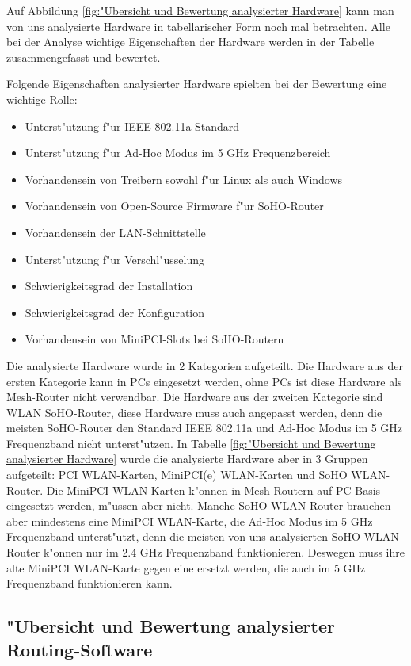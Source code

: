 Auf Abbildung \ref{fig:"Ubersicht und Bewertung analysierter Hardware}
kann man von uns analysierte Hardware in tabellarischer Form noch mal
betrachten. Alle bei der Analyse wichtige Eigenschaften der Hardware
werden in der Tabelle zusammengefasst und bewertet.

Folgende Eigenschaften analysierter Hardware spielten bei der Bewertung
eine wichtige Rolle:

\begin{itemize}
\item Unterst"utzung f"ur IEEE 802.11a Standard
\item Unterst"utzung f"ur Ad-Hoc Modus im 5 GHz Frequenzbereich
\item Vorhandensein von Treibern sowohl f"ur Linux als auch Windows
\item Vorhandensein von Open-Source Firmware f"ur SoHO-Router
\item Vorhandensein der LAN-Schnittstelle
\item Unterst"utzung f"ur Verschl"usselung
\item Schwierigkeitsgrad der Installation
\item Schwierigkeitsgrad der Konfiguration
\item Vorhandensein von MiniPCI-Slots bei SoHO-Routern
\end{itemize}

Die analysierte Hardware wurde in 2 Kategorien aufgeteilt. Die Hardware
aus der ersten Kategorie kann in PCs eingesetzt werden, ohne PCs ist diese
Hardware als Mesh-Router nicht verwendbar. Die Hardware aus der zweiten
Kategorie sind WLAN SoHO-Router, diese Hardware muss auch angepasst werden,
denn die meisten SoHO-Router den Standard IEEE 802.11a und Ad-Hoc Modus
im 5 GHz Frequenzband nicht unterst"utzen. In Tabelle
\ref{fig:"Ubersicht und Bewertung analysierter Hardware} wurde die analysierte
Hardware aber in 3 Gruppen aufgeteilt: PCI WLAN-Karten, MiniPCI(e) WLAN-Karten
und SoHO WLAN-Router. Die MiniPCI WLAN-Karten k"onnen in Mesh-Routern auf
PC-Basis eingesetzt werden, m"ussen aber nicht. Manche SoHO WLAN-Router
brauchen aber mindestens eine MiniPCI WLAN-Karte, die Ad-Hoc Modus
im 5 GHz Frequenzband unterst"utzt, denn die meisten von uns analysierten
SoHO WLAN-Router k"onnen nur im 2.4 GHz Frequenzband funktionieren.
Deswegen muss ihre alte MiniPCI WLAN-Karte gegen eine ersetzt werden,
die auch im 5 GHz Frequenzband funktionieren kann.


\subsection{"Ubersicht und Bewertung analysierter Routing-Software}

